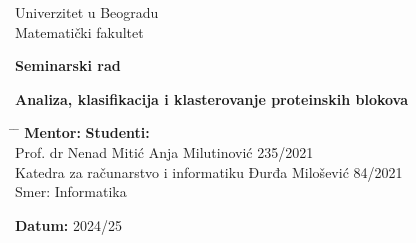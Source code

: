 \documentclass[a4paper,12pt]{article}
\begin{document}
\begin{titlepage}
    \centering
    \vspace*{0.2cm}

    { Univerzitet u Beogradu \\ Matematički fakultet\par}

    \vfill

    {\Large \textbf{Seminarski rad}\par}

    \vspace{1cm}

    {\Large \textbf{Analiza, klasifikacija i klasterovanje proteinskih blokova}\par}

    \vfill

    
	
	
	\begin{tabbing}
	\hspace{10cm} \= \hspace{10cm} \= \kill
	\textbf{Mentor:} \>  \textbf{Studenti:} \\
	Prof. dr Nenad Mitić \> Anja Milutinović 235/2021 \\
	Katedra za računarstvo i informatiku \> Đurđa Milošević 84/2021 \\
	\> Smer: Informatika
	\end{tabbing}

    \vfill

    \textbf{Datum:} 2024/25

\end{titlepage}
\newpage
\tableofcontents
\newpage
\end{document}
